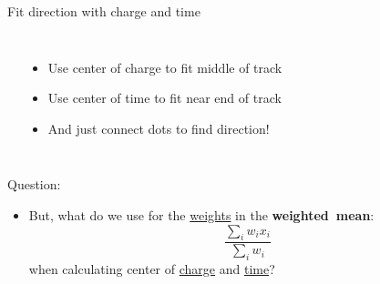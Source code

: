 \documentclass[14pt]{beamer}
\begin{document}
\begin{frame}{Fit direction with {\color{magenta}charge} and {\color{blue}time}}
\begin{columns}[T]
\begin{block}{}
		\end{block}
		\begin{itemize}
			\item<2-> Use {\color{magenta}center of charge} to fit middle of
				track
			\item<3-> Use {\color{blue}center of time} to fit near end of track
			\item<4-> And just connect dots to find direction!
		\end{itemize}
	\end{columns}
\end{frame}

\begin{frame}{Question:}
	\begin{itemize}
		\item<2-> {
				But, what do we use for the \underline{weights} in the
				\textbf{weighted~mean}:
				\begin{equation*}
					\frac{\sum_{i} w_{i}x_{i}}{\sum_{i} w_{i}}
				\end{equation*}
				when calculating center of {\color{magenta}\underline{charge}} and
				{\color{blue}\underline{time}}?
			}
	\end{itemize}
\end{frame}
\end{document}
